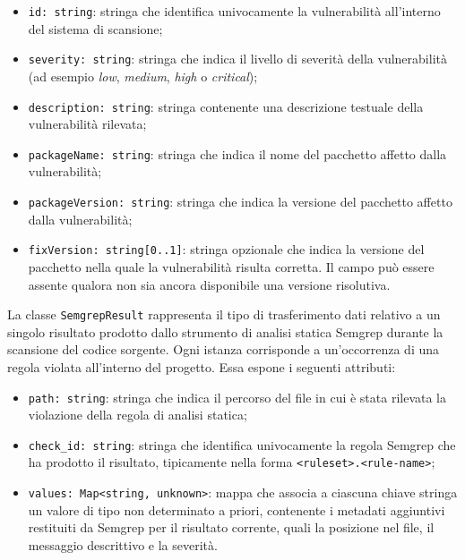 \documentclass[a4paper, 11pt]{article}
\newcounter{subsubsubsection}[subsubsection]
\begin{document}
\begin{itemize}
  \item \texttt{id: string}: stringa che identifica univocamente la vulnerabilità all'interno del
    sistema di scansione;
 
  \item \texttt{severity: string}: stringa che indica il livello di severità della vulnerabilità
    (ad esempio \textit{low}, \textit{medium}, \textit{high} o \textit{critical});
 
  \item \texttt{description: string}: stringa contenente una descrizione testuale della
    vulnerabilità rilevata;
 
  \item \texttt{packageName: string}: stringa che indica il nome del pacchetto affetto dalla
    vulnerabilità;
 
  \item \texttt{packageVersion: string}: stringa che indica la versione del pacchetto affetto dalla
    vulnerabilità;
 
  \item \texttt{fixVersion: string[0..1]}: stringa opzionale che indica la versione del pacchetto
    nella quale la vulnerabilità risulta corretta. Il campo può essere assente qualora non sia
    ancora disponibile una versione risolutiva.
\end{itemize}

\label{sec:SemgrepResult}
 
La classe \texttt{SemgrepResult} rappresenta il tipo di trasferimento dati relativo a un singolo
risultato prodotto dallo strumento di analisi statica Semgrep durante la scansione del codice
sorgente. Ogni istanza corrisponde a un'occorrenza di una regola violata all'interno del progetto.
Essa espone i seguenti attributi:
 
\begin{itemize}
  \item \texttt{path: string}: stringa che indica il percorso del file in cui è stata rilevata la
    violazione della regola di analisi statica;
 
  \item \texttt{check\_id: string}: stringa che identifica univocamente la regola Semgrep che ha
    prodotto il risultato, tipicamente nella forma \texttt{<ruleset>.<rule-name>};
 
  \item \texttt{values: Map<string, unknown>}: mappa che associa a ciascuna chiave stringa un
    valore di tipo non determinato a priori, contenente i metadati aggiuntivi restituiti da Semgrep
    per il risultato corrente, quali la posizione nel file, il messaggio descrittivo e la severità.
\end{itemize}
 
\end{document}
